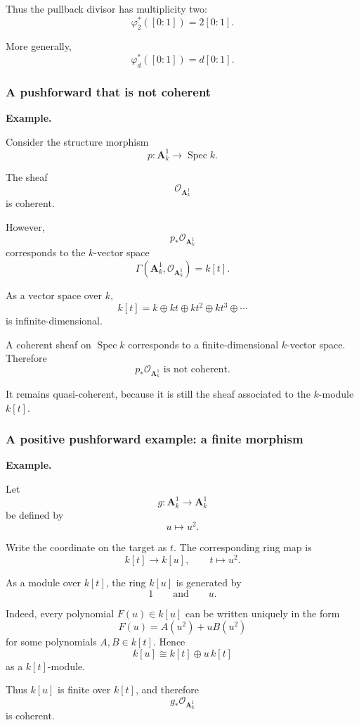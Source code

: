 Thus the pullback divisor has multiplicity two:
\[
\varphi_2^*([0:1])=2[0:1].
\]

More generally,
\[
\varphi_d^*([0:1])=d[0:1].
\]

\subsubsection{A pushforward that is not coherent}

\textbf{Example.}

Consider the structure morphism
\[
p:\mathbf A^1_k\longrightarrow\operatorname{Spec}k.
\]

The sheaf
\[
\mathcal O_{\mathbf A^1_k}
\]
is coherent.

However,
\[
p_*\mathcal O_{\mathbf A^1_k}
\]
corresponds to the \(k\)-vector space
\[
\Gamma(\mathbf A^1_k,\mathcal O_{\mathbf A^1_k})
=
k[t].
\]

As a vector space over \(k\),
\[
k[t]
=
k\oplus kt\oplus kt^2\oplus kt^3\oplus\cdots
\]
is infinite-dimensional.

A coherent sheaf on \(\operatorname{Spec}k\) corresponds to a finite-dimensional \(k\)-vector space. Therefore
\[
\boxed{
	p_*\mathcal O_{\mathbf A^1_k}
	\text{ is not coherent.}
}
\]

It remains quasi-coherent, because it is still the sheaf associated to the \(k\)-module \(k[t]\).

\subsubsection{A positive pushforward example: a finite morphism}

\textbf{Example.}

Let
\[
g:\mathbf A^1_k\longrightarrow\mathbf A^1_k
\]
be defined by
\[
u\longmapsto u^2.
\]

Write the coordinate on the target as \(t\). The corresponding ring map is
\[
k[t]\longrightarrow k[u],
\qquad
t\longmapsto u^2.
\]

As a module over \(k[t]\), the ring \(k[u]\) is generated by
\[
1
\qquad\text{and}\qquad
u.
\]

Indeed, every polynomial \(F(u)\in k[u]\) can be written uniquely in the form
\[
F(u)=A(u^2)+uB(u^2)
\]
for some polynomials \(A,B\in k[t]\). Hence
\[
k[u]\cong k[t]\oplus u\,k[t]
\]
as a \(k[t]\)-module.

Thus \(k[u]\) is finite over \(k[t]\), and therefore
\[
g_*\mathcal O_{\mathbf A^1_k}
\]
is coherent.

